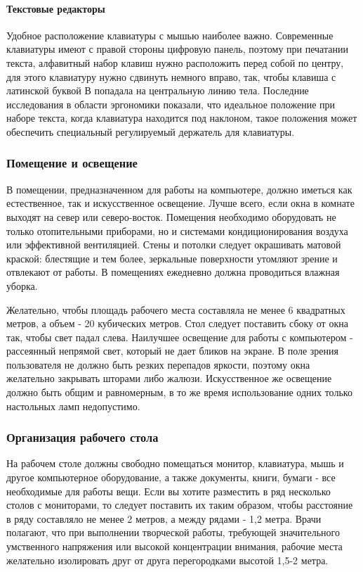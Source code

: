 \documentclass[russian,utf8,emptystyle]{eskdtext}
\begin{document}
\begin{spacing}{1.5}
\paragraph{Текстовые редакторы}
Удобное расположение клавиатуры с мышью наиболее важно. Современные клавиатуры имеют с правой стороны цифровую панель, поэтому при печатании текста, алфавитный набор клавиш нужно расположить перед собой по центру, для этого клавиатуру нужно сдвинуть немного вправо, так, чтобы клавиша с латинской буквой В попадала на центральную линию тела. Последние исследования в области эргономики показали, что идеальное положение при наборе текста, когда клавиатура находится под наклоном, такое положения может обеспечить специальный регулируемый держатель для клавиатуры.

\subsubsection{Помещение и освещение}
В помещении, предназначенном для работы на компьютере, должно иметься как естественное, так и искусственное освещение. Лучше всего, если окна в комнате выходят на север или северо-восток. Помещения необходимо оборудовать не только отопительными приборами, но и системами кондиционирования воздуха или эффективной вентиляцией. Стены и потолки следует окрашивать матовой краской: блестящие и тем более, зеркальные поверхности утомляют зрение и отвлекают от работы. В помещениях ежедневно должна проводиться влажная уборка.

Желательно, чтобы площадь рабочего места составляла не менее 6 квадратных метров, а объем - 20 кубических метров. Стол следует поставить сбоку от окна так, чтобы свет падал слева. Наилучшее освещение для работы с компьютером - рассеянный непрямой свет, который не дает бликов на экране. В поле зрения пользователя не должно быть резких перепадов яркости, поэтому окна желательно закрывать шторами либо жалюзи. Искусственное же освещение должно быть общим и равномерным, в то же время использование одних только настольных ламп недопустимо.

\subsubsection{Организация рабочего стола}

На рабочем столе должны свободно помещаться монитор, клавиатура, мышь и другое компьютерное оборудование, а также документы, книги, бумаги - все необходимые для работы вещи. Если вы хотите разместить в ряд несколько столов с мониторами, то следует поставить их таким образом, чтобы расстояние в ряду составляло не менее 2 метров, а между рядами - 1,2 метра. Врачи полагают, что при выполнении творческой работы, требующей значительного умственного напряжения или высокой концентрации внимания, рабочие места желательно изолировать друг от друга перегородками высотой 1,5-2 метра.


\end{spacing}
\end{document}
